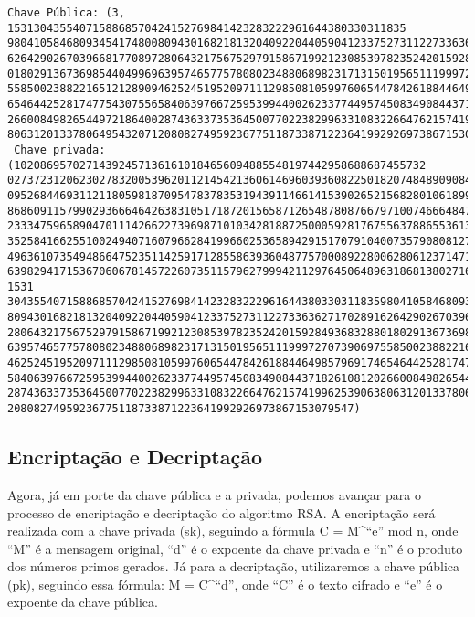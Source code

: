 \documentclass[11pt]{article}
\begin{document}
    \begin{Verbatim}[commandchars=\\\{\}]
Chave Pública: (3, 1531304355407158868570424152769841423283222961644380330311835
98041058468093454174800809430168218132040922044059041233752731122733636271702891
62642902670396681770897280643217567529791586719921230853978235242015928493683288
01802913673698544049969639574657757808023488068982317131501956511199972707390697
55850023882216512128909462524519520971112985081059976065447842618844649857969174
65464425281747754307556584063976672595399440026233774495745083490844371826108120
26600849826544972186400287436337353645007702238299633108322664762157419962539063
8063120133780649543207120808274959236775118733871223641992926973867153079547).
 Chave privada: (102086957027143924571361610184656094885548197442958688687455732
02737231206230278320053962011214542136061469603936082250182074848909084780192775
09526844693112118059818709547837835319439114661415390265215682801061899578885867
86860911579902936664642638310517187201565871265487808766797100746664847159379837
23334759658904701114266227396987101034281887250005928176755637886553613303454141
35258416625510024940716079662841996602536589429151707910400735790808127535917801
49636107354948664752351142591712855863936048775700089228006280612371471086239438
63982941715367060678145722607351157962799942112976450648963186813802716411, 1531
30435540715886857042415276984142328322296164438033031183598041058468093454174800
80943016821813204092204405904123375273112273363627170289162642902670396681770897
28064321756752979158671992123085397823524201592849368328801802913673698544049969
63957465775780802348806898231713150195651119997270739069755850023882216512128909
46252451952097111298508105997606544784261884464985796917465464425281747754307556
58406397667259539944002623377449574508349084437182610812026600849826544972186400
28743633735364500770223829963310832266476215741996253906380631201337806495432071
20808274959236775118733871223641992926973867153079547)
    \end{Verbatim}

    \hypertarget{encriptauxe7uxe3o-e-decriptauxe7uxe3o}{%
\subsection{Encriptação e
Decriptação}\label{encriptauxe7uxe3o-e-decriptauxe7uxe3o}}

Agora, já em porte da chave pública e a privada, podemos avançar para o
processo de encriptação e decriptação do algoritmo RSA. A encriptação
será realizada com a chave privada (sk), seguindo a fórmula C =
M\^{}``e'' mod n, onde ``M'' é a mensagem original, ``d'' é o expoente
da chave privada e ``n'' é o produto dos números primos gerados. Já para
a decriptação, utilizaremos a chave pública (pk), seguindo essa fórmula:
M = C\^{}``d'', onde ``C'' é o texto cifrado e ``e'' é o expoente da
chave pública.
\end{document}
